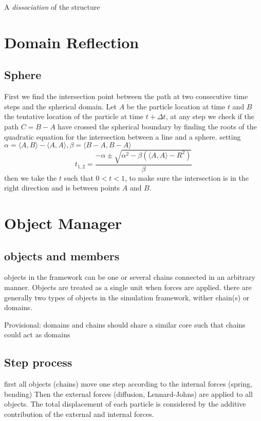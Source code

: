 \documentclass[12pt]{report}
\begin{document}
A \textit{dissociation} of the structure 
 

\section{Domain Reflection}
\subsection{Sphere}
First we find the intersection point between the path at two consecutive time steps and the spherical domain. Let $A$ be the particle location at time $t$ and $B$ the tentative location of the particle at time $t+\Delta t$, at any step we check if the path $C=B-A$ have crossed the spherical boundary by finding the roots of the quadratic equation for the intersection between a line and a sphere. setting $\alpha= \langle A,B \rangle -\langle A,A \rangle , \beta = \langle B-A,B-A \rangle$
\begin{equation*}
t_{1,2}=\frac{-\alpha \pm \sqrt{\alpha^2-\beta (\langle A,A \rangle -R^2)}}{\beta}
\end{equation*}
then we take the $t$ such that $0<t<1$, to make sure the intersection is in the right direction and is between points $A$ and $B$.

\section{Object Manager}
\subsection{objects and members}
objects in the framework can be one or several chains connected in an arbitrary manner. Objects are treated as a single unit when forces are applied. 
there are generally two types of objects in the simulation framework, wither  chain(s) or domains. 

Provisional: domains and chains should share a similar core such that chains could act as domains 

\subsection{Step process}
first all objects (chains) move one step according to the internal forces (spring, bending)
Then the external forces (diffusion, Lennard-Johns) are applied to all objects. 
The total displacement of each particle is considered by the additive contribution of the external and internal forces. 
\end{document}
